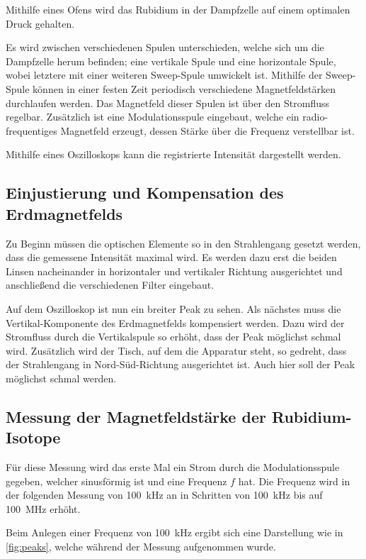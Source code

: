     Mithilfe eines Ofens wird das Rubidium in der Dampfzelle auf einem optimalen Druck gehalten.

    Es wird zwischen verschiedenen Spulen unterschieden,
    welche sich um die Dampfzelle herum befinden;
    eine vertikale Spule und eine horizontale Spule,
    wobei letztere mit einer weiteren Sweep-Spule umwickelt ist.
    Mithilfe der Sweep-Spule können in einer festen Zeit periodisch verschiedene Magnetfeldstärken durchlaufen werden.
    Das Magnetfeld dieser Spulen ist über den Stromfluss regelbar.
    Zusätzlich ist eine Modulationsspule eingebaut,
    welche ein radio-frequentiges Magnetfeld erzeugt,
    dessen Stärke über die Frequenz verstellbar ist.

    Mithilfe eines Oszilloskops kann die registrierte Intensität dargestellt werden.

\subsection{Einjustierung und Kompensation des Erdmagnetfelds}

    Zu Beginn müssen die optischen Elemente so in den Strahlengang gesetzt werden,
    dass die gemessene Intensität maximal wird.
    Es werden dazu erst die beiden Linsen nacheinander in horizontaler und vertikaler Richtung ausgerichtet und anschließend die verschiedenen Filter eingebaut.

    Auf dem Oszilloskop ist nun ein breiter Peak zu sehen.
    Als nächstes muss die Vertikal-Komponente des Erdmagnetfelds kompensiert werden.
    Dazu wird der Stromfluss durch die Vertikalspule so erhöht,
    dass der Peak möglichst schmal wird.
    Zusätzlich wird der Tisch,
    auf dem die Apparatur steht,
    so gedreht,
    dass der Strahlengang in Nord-Süd-Richtung ausgerichtet ist.
    Auch hier soll der Peak möglichst schmal werden.

\subsection{Messung der Magnetfeldstärke der Rubidium-Isotope}

    Für diese Messung wird das erste Mal ein Strom durch die Modulationsspule gegeben,
    welcher sinusförmig ist und eine Frequenz $f$ hat.
    Die Frequenz wird in der folgenden Messung von \SI{100}{\kilo\hertz} an in Schritten von \SI{100}{\kilo\hertz} bis auf \SI{100}{\mega\hertz} erhöht.

    Beim Anlegen einer Frequenz von \SI{100}{\kilo\hertz} ergibt sich eine Darstellung wie in \autoref{fig:peaks},
    welche während der Messung aufgenommen wurde.

